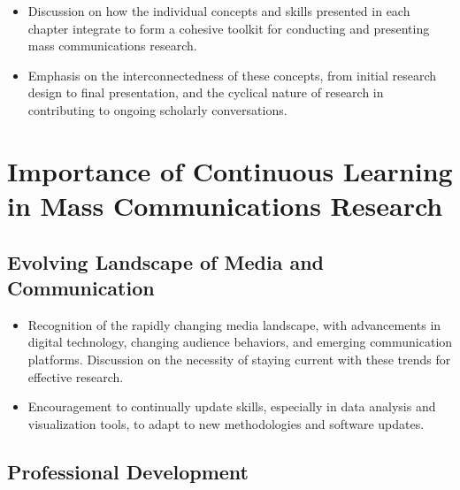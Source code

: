 \documentclass[
]{book}
\begin{document}
\begin{itemize}
\item
  Discussion on how the individual concepts and skills presented in each chapter integrate to form a cohesive toolkit for conducting and presenting mass communications research.
\item
  Emphasis on the interconnectedness of these concepts, from initial research design to final presentation, and the cyclical nature of research in contributing to ongoing scholarly conversations.
\end{itemize}

\hypertarget{importance-of-continuous-learning-in-mass-communications-research}{%
\section*{Importance of Continuous Learning in Mass Communications Research}\label{importance-of-continuous-learning-in-mass-communications-research}}

\hypertarget{evolving-landscape-of-media-and-communication}{%
\subsection*{Evolving Landscape of Media and Communication}\label{evolving-landscape-of-media-and-communication}}

\begin{itemize}
\item
  Recognition of the rapidly changing media landscape, with advancements in digital technology, changing audience behaviors, and emerging communication platforms. Discussion on the necessity of staying current with these trends for effective research.
\item
  Encouragement to continually update skills, especially in data analysis and visualization tools, to adapt to new methodologies and software updates.
\end{itemize}

\hypertarget{professional-development}{%
\subsection*{Professional Development}\label{professional-development}}
\end{document}
